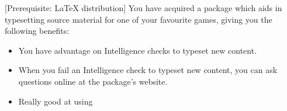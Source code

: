 \label{f:TypesettingSavant}

[Prerequisite: \LaTeX{} distribution]
You have acquired a package which aids in typesetting source material for one of your favourite games, giving you the following benefits:

\begin{itemize}
  \item You have advantage on Intelligence checks to typeset new content.
  \item When you fail an Intelligence check to typeset new content, you can ask questions online at the package's website.
  \item Really good at using 
\end{itemize}